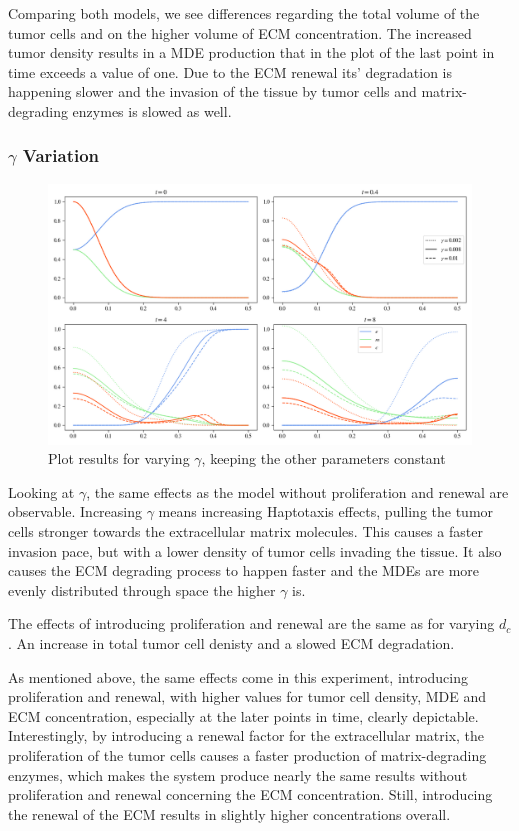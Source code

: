 Comparing both models, we see differences regarding the total volume of the tumor cells and on the higher volume of ECM concentration. The increased tumor density results in a MDE production that in the plot of the last point in time exceeds a value of one. Due to the ECM renewal its' degradation is happening slower and the invasion of the tissue by tumor cells and matrix-degrading enzymes is slowed as well.

\subsubsection*{$\gamma$ Variation}
\begin{figure}[h!]
    \centering
    \includegraphics[width=\textwidth]{resources/images/prolif_gamma_variation.png}
    \caption{Plot results for varying $\gamma$, keeping the other parameters constant}
    \label{fig:prolif_gamma_variation}
\end{figure}

Looking at $\gamma$, the same effects as the model without proliferation and renewal are observable. Increasing $\gamma$ means increasing Haptotaxis effects, pulling the tumor cells stronger towards the extracellular matrix molecules. This causes a faster invasion pace, but with a lower density of tumor cells invading the tissue. It also causes the ECM degrading process to happen faster and the MDEs are more evenly distributed through space the higher $\gamma$ is.

The effects of introducing proliferation and renewal are the same as for varying $d_c$. An increase in total tumor cell denisty and a slowed ECM degradation. 

As mentioned above, the same effects come in this experiment, introducing proliferation and renewal, with higher values for tumor cell density, MDE and ECM concentration, especially at the later points in time, clearly depictable. Interestingly, by introducing a renewal factor for the extracellular matrix, the proliferation of the tumor cells causes a faster production of matrix-degrading enzymes, which makes the system produce nearly the same results without proliferation and renewal concerning the ECM concentration. Still, introducing the renewal of the ECM results in slightly higher concentrations overall.

